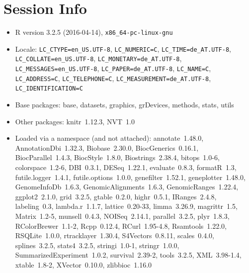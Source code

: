 \documentclass[11pt]{article}\usepackage[]{graphicx}\usepackage[usenames,dvipsnames]{color}
\begin{document}
\section{Session Info}

\begin{itemize}\raggedright
  \item R version 3.2.5 (2016-04-14), \verb|x86_64-pc-linux-gnu|
  \item Locale: \verb|LC_CTYPE=en_US.UTF-8|, \verb|LC_NUMERIC=C|, \verb|LC_TIME=de_AT.UTF-8|, \verb|LC_COLLATE=en_US.UTF-8|, \verb|LC_MONETARY=de_AT.UTF-8|, \verb|LC_MESSAGES=en_US.UTF-8|, \verb|LC_PAPER=de_AT.UTF-8|, \verb|LC_NAME=C|, \verb|LC_ADDRESS=C|, \verb|LC_TELEPHONE=C|, \verb|LC_MEASUREMENT=de_AT.UTF-8|, \verb|LC_IDENTIFICATION=C|
  \item Base packages: base, datasets, graphics, grDevices, methods, stats,
    utils
  \item Other packages: knitr~1.12.3, NVT~1.0
  \item Loaded via a namespace (and not attached): annotate~1.48.0,
    AnnotationDbi~1.32.3, Biobase~2.30.0, BiocGenerics~0.16.1,
    BiocParallel~1.4.3, BiocStyle~1.8.0, Biostrings~2.38.4, bitops~1.0-6,
    colorspace~1.2-6, DBI~0.3.1, DESeq~1.22.1, evaluate~0.8.3, formatR~1.3,
    futile.logger~1.4.1, futile.options~1.0.0, genefilter~1.52.1,
    geneplotter~1.48.0, GenomeInfoDb~1.6.3, GenomicAlignments~1.6.3,
    GenomicRanges~1.22.4, ggplot2~2.1.0, grid~3.2.5, gtable~0.2.0, highr~0.5.1,
    IRanges~2.4.8, labeling~0.3, lambda.r~1.1.7, lattice~0.20-33, limma~3.26.9,
    magrittr~1.5, Matrix~1.2-5, munsell~0.4.3, NOISeq~2.14.1, parallel~3.2.5,
    plyr~1.8.3, RColorBrewer~1.1-2, Rcpp~0.12.4, RCurl~1.95-4.8,
    Rsamtools~1.22.0, RSQLite~1.0.0, rtracklayer~1.30.4, S4Vectors~0.8.11,
    scales~0.4.0, splines~3.2.5, stats4~3.2.5, stringi~1.0-1, stringr~1.0.0,
    SummarizedExperiment~1.0.2, survival~2.39-2, tools~3.2.5, XML~3.98-1.4,
    xtable~1.8-2, XVector~0.10.0, zlibbioc~1.16.0
\end{itemize}




\newpage


\end{document}
